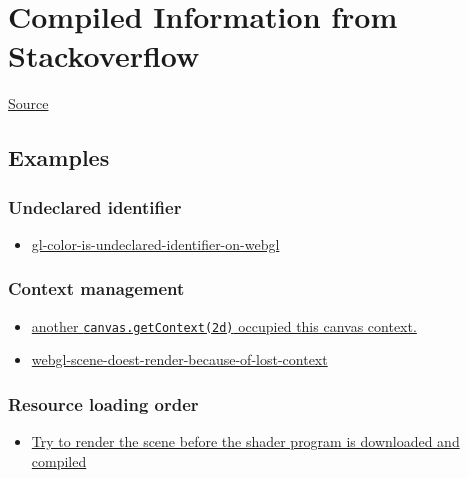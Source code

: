 \section{Compiled Information from
Stackoverflow}\label{compiled-information-from-stackoverflow}

\href{http://stackoverflow.com/search?q=WebGL}{Source}

\subsection{Examples}\label{examples}

\subsubsection{Undeclared identifier}\label{undeclared-identifier}

\begin{itemize}
\tightlist
\item
  \href{http://stackoverflow.com/questions/4468329/gl-color-is-undeclared-identifier-on-webgl}{gl-color-is-undeclared-identifier-on-webgl}
\end{itemize}

\subsubsection{Context management}\label{context-management}

\begin{itemize}
\tightlist
\item
  \href{http://stackoverflow.com/questions/27544729/three-js-error-creating-webgl-context}{another
  \texttt{canvas.getContext(\textquotesingle{}2d\textquotesingle{})}
  occupied this canvas context.}
\item
  \href{http://stackoverflow.com/questions/25219352/webgl-scene-doest-render-because-of-lost-context}{webgl-scene-doest-render-because-of-lost-context}
\end{itemize}

\subsubsection{Resource loading order}\label{resource-loading-order}

\begin{itemize}
\tightlist
\item
  \href{http://stackoverflow.com/questions/14943148/webgl-getattriblocation-no-object-shader-issue}{Try
  to render the scene before the shader program is downloaded and
  compiled}
\end{itemize}

